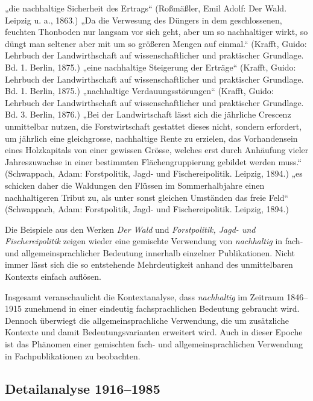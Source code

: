 \documentclass[
    german,
    a4paper,%
    12pt,%
    oneside,%
    toc=bibliography,
    final,
]{scrartcl}
\begin{document}
\begin{exe}
\ex \label{ex-1846-1915-forst-allg-1} „die nachhaltige Sicherheit des Ertrags“ (Roßmäßler, Emil Adolf: Der Wald. Leipzig u. a., 1863.)
\ex „Da die Verwesung des Düngers in dem geschlossenen, feuchten Thonboden nur langsam vor sich geht, aber um so nachhaltiger wirkt, so düngt man seltener aber mit um so größeren Mengen auf einmal.“ (Krafft, Guido: Lehrbuch der Landwirthschaft auf wissenschaftlicher und praktischer Grundlage. Bd. 1. Berlin, 1875.)
\ex „eine nachhaltige Steigerung der Erträge“ (Krafft, Guido: Lehrbuch der Landwirthschaft auf wissenschaftlicher und praktischer Grundlage. Bd. 1. Berlin, 1875.)
\ex „nachhaltige Verdauungsstörungen“ (Krafft, Guido: Lehrbuch der Landwirthschaft auf wissenschaftlicher und praktischer Grundlage. Bd. 3. Berlin, 1876.)
\ex „Bei der Landwirtschaft lässt sich die jährliche Crescenz unmittelbar nutzen, die Forstwirtschaft gestattet dieses nicht, sondern erfordert, um jährlich eine gleichgrosse, nachhaltige Rente zu erzielen, das Vorhandensein eines Holzkapitals von einer gewissen Grösse, welches erst durch Anhäufung vieler Jahreszuwachse in einer bestimmten Flächengruppierung gebildet werden muss.“ (Schwappach, Adam: Forstpolitik, Jagd- und Fischereipolitik. Leipzig, 1894.)
\ex \label{ex-1846-1915-forst-allg-n} „es schicken daher die Waldungen den Flüssen im Sommerhalbjahre einen nachhaltigeren Tribut zu, als unter sonst gleichen Umständen das freie Feld“ (Schwappach, Adam: Forstpolitik, Jagd- und Fischereipolitik. Leipzig, 1894.)
\end{exe}

Die Beispiele aus den Werken \textit{Der Wald} und \textit{Forstpolitik, Jagd- und Fischereipolitik} zeigen wieder eine gemischte Verwendung von \textit{nachhaltig} in fach- und allgemeinsprachlicher Bedeutung innerhalb einzelner Publikationen. Nicht immer lässt sich die so entstehende Mehrdeutigkeit anhand des unmittelbaren Kontexts einfach auflösen.

Insgesamt veranschaulicht die Kontextanalyse, dass \textit{nachhaltig} im Zeitraum 1846–1915 zunehmend in einer eindeutig fachsprachlichen Bedeutung gebraucht wird. Dennoch überwiegt die allgemeinsprachliche Verwendung, die um zusätzliche Kontexte und damit Bedeutungsvarianten erweitert wird. Auch in dieser Epoche ist das Phänomen einer gemischten fach- und allgemeinsprachlichen Verwendung in Fachpublikationen zu beobachten.


\subsection{Detailanalyse 1916–1985}
\label{subsec:detail-1916–1985}
\end{document}
